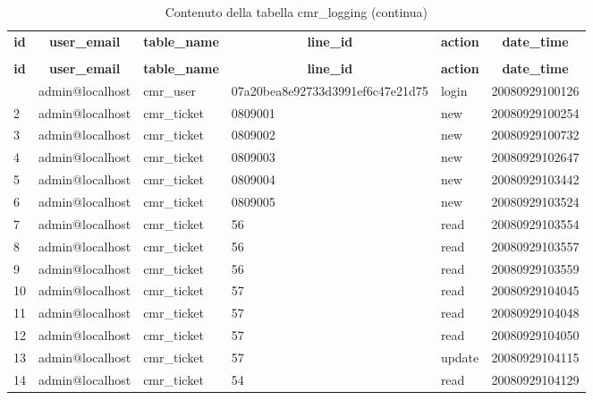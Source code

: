 %
%
 \begin{longtable}{|l|l|l|l|l|l|} 
 \hline \endhead \hline \endfoot \hline 
 \caption{Contenuto della tabella cmr\_logging} \label{tab:cmr_logging-data} \\\hline \multicolumn{1}{|c|}{\textbf{id}} & \multicolumn{1}{|c|}{\textbf{user\_email}} & \multicolumn{1}{|c|}{\textbf{table\_name}} & \multicolumn{1}{|c|}{\textbf{line\_id}} & \multicolumn{1}{|c|}{\textbf{action}} & \multicolumn{1}{|c|}{\textbf{date\_time}} \\ \hline \hline  \endfirsthead 
\caption{Contenuto della tabella cmr\_logging (continua)} \\ \hline \multicolumn{1}{|c|}{\textbf{id}} & \multicolumn{1}{|c|}{\textbf{user\_email}} & \multicolumn{1}{|c|}{\textbf{table\_name}} & \multicolumn{1}{|c|}{\textbf{line\_id}} & \multicolumn{1}{|c|}{\textbf{action}} & \multicolumn{1}{|c|}{\textbf{date\_time}} \\ \hline \hline \endhead \endfoot
1 & admin@localhost & cmr\_user & 07a20bea8e92733d3991ef6c47e21d75 & login & 20080929100126 \\ \hline 
2 & admin@localhost & cmr\_ticket & 0809001 & new & 20080929100254 \\ \hline 
3 & admin@localhost & cmr\_ticket & 0809002 & new & 20080929100732 \\ \hline 
4 & admin@localhost & cmr\_ticket & 0809003 & new & 20080929102647 \\ \hline 
5 & admin@localhost & cmr\_ticket & 0809004 & new & 20080929103442 \\ \hline 
6 & admin@localhost & cmr\_ticket & 0809005 & new & 20080929103524 \\ \hline 
7 & admin@localhost & cmr\_ticket & 56 & read & 20080929103554 \\ \hline 
8 & admin@localhost & cmr\_ticket & 56 & read & 20080929103557 \\ \hline 
9 & admin@localhost & cmr\_ticket & 56 & read & 20080929103559 \\ \hline 
10 & admin@localhost & cmr\_ticket & 57 & read & 20080929104045 \\ \hline 
11 & admin@localhost & cmr\_ticket & 57 & read & 20080929104048 \\ \hline 
12 & admin@localhost & cmr\_ticket & 57 & read & 20080929104050 \\ \hline 
13 & admin@localhost & cmr\_ticket & 57 & update & 20080929104115 \\ \hline 
14 & admin@localhost & cmr\_ticket & 54 & read & 20080929104129 \\ \hline 

\end{longtable}
